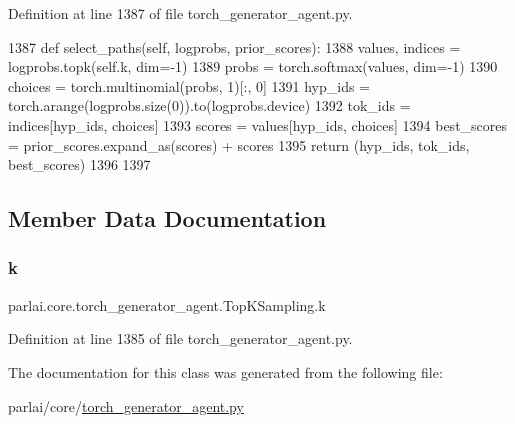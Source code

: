 Definition at line 1387 of file torch\+\_\+generator\+\_\+agent.\+py.


\begin{DoxyCode}
1387     \textcolor{keyword}{def }select\_paths(self, logprobs, prior\_scores):
1388         values, indices = logprobs.topk(self.k, dim=-1)
1389         probs = torch.softmax(values, dim=-1)
1390         choices = torch.multinomial(probs, 1)[:, 0]
1391         hyp\_ids = torch.arange(logprobs.size(0)).to(logprobs.device)
1392         tok\_ids = indices[hyp\_ids, choices]
1393         scores = values[hyp\_ids, choices]
1394         best\_scores = prior\_scores.expand\_as(scores) + scores
1395         \textcolor{keywordflow}{return} (hyp\_ids, tok\_ids, best\_scores)
1396 
1397 
\end{DoxyCode}


\subsection{Member Data Documentation}
\mbox{\label{classparlai_1_1core_1_1torch__generator__agent_1_1TopKSampling_a69d2f8e711e51151aa6649a4889e8243}} 
\subsubsection{\texorpdfstring{k}{k}}
{\footnotesize\ttfamily parlai.\+core.\+torch\+\_\+generator\+\_\+agent.\+Top\+K\+Sampling.\+k}



Definition at line 1385 of file torch\+\_\+generator\+\_\+agent.\+py.



The documentation for this class was generated from the following file\+:\begin{DoxyCompactItemize}
\item 
parlai/core/\hyperlink{torch__generator__agent_8py}{torch\+\_\+generator\+\_\+agent.\+py}\end{DoxyCompactItemize}
